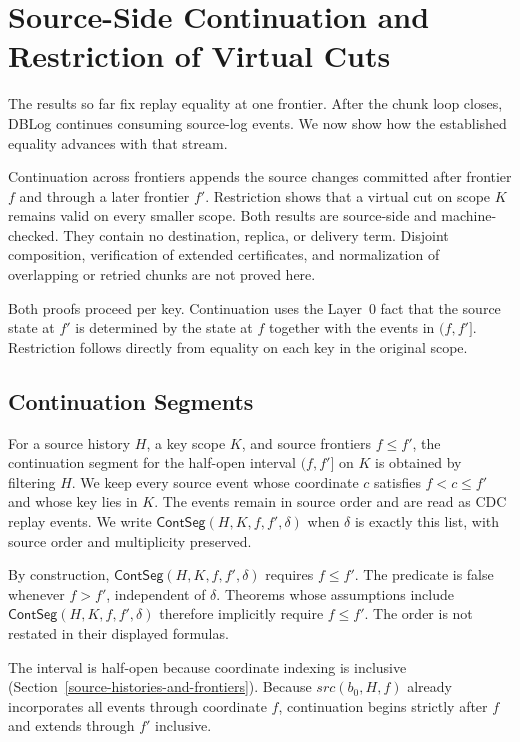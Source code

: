 \documentclass[letterpaper,10pt,twocolumn]{article}
\newcommand{\Src}{\mathit{src}}
\newcommand{\ContSeg}{\mathsf{ContSeg}}
\begin{document}
\section{Source-Side Continuation and Restriction of Virtual
Cuts}\label{source-side-continuation-and-restriction}

The results so far fix replay equality at one frontier. After the chunk
loop closes, DBLog continues consuming source-log events. We now show
how the established equality advances with that stream.

Continuation across frontiers appends the source changes committed
after frontier $f$ and through a later frontier $f'$. Restriction shows
that a virtual cut on scope $K$ remains valid on every smaller scope.
Both results are source-side and machine-checked. They contain no
destination, replica, or delivery term. Disjoint composition,
verification of extended certificates, and normalization of overlapping
or retried chunks are not proved here.

Both proofs proceed per key. Continuation uses the Layer~0 fact that the
source state at $f'$ is determined by the state at $f$ together with the
events in $(f,f']$. Restriction follows directly from equality on each
key in the original scope.

\subsection{Continuation Segments}\label{continuation-segments}

For a source history $H$, a key scope $K$, and source frontiers
$f \le f'$, the continuation segment for the half-open interval
$(f,f']$ on $K$ is obtained by filtering $H$. We keep every source event
whose coordinate $c$ satisfies $f<c\le f'$ and whose key lies in $K$.
The events remain in source order and are read as CDC replay events. We
write $\ContSeg(H,K,f,f',\delta)$ when $\delta$ is exactly this list,
with source order and multiplicity preserved.

By construction, $\ContSeg(H,K,f,f',\delta)$ requires $f \le f'$. The
predicate is false whenever $f > f'$, independent of $\delta$. Theorems
whose assumptions include $\ContSeg(H,K,f,f',\delta)$ therefore implicitly
require $f \le f'$. The order is not restated in their displayed
formulas.

The interval is half-open because coordinate indexing is inclusive
(Section~\ref{source-histories-and-frontiers}). Because $\Src(b_0,H,f)$ already
incorporates all events through coordinate $f$, continuation begins strictly
after $f$ and extends through $f'$ inclusive.
\end{document}
